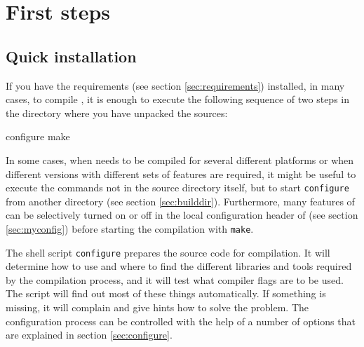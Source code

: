 %  
%   
%  
%  
%
\chapter{First steps}
\label{chap:firststeps}

\section{Quick installation}


If you have the requirements (see section \vref{sec:requirements})
installed, in many cases, to compile \es{}, it is enough to execute
the following sequence of two steps in the directory where you have
unpacked the sources:
\begin{code}
configure
make
\end{code}

In some cases, \eg{} when \es{} needs to be compiled for several
different platforms or when different versions with different sets of
features are required, it might be useful to execute the commands not
in the source directory itself, but to start \texttt{configure} from
another directory (see section \vref{sec:builddir}). Furthermore, many
features of \es{} can be selectively turned on or off in the local
configuration header of \es{} (see section \vref{sec:myconfig}) before
starting the compilation with \texttt{make}.

The shell script \texttt{configure} prepares the source code for
compilation. It will determine how to use and where to find the
different libraries and tools required by the compilation process, and
it will test what compiler flags are to be used.  The script will find
out most of these things automatically.  If something is missing, it
will complain and give hints how to solve the problem.  The
configuration process can be controlled with the help of a number of
options that are explained in section \vref{sec:configure}.

